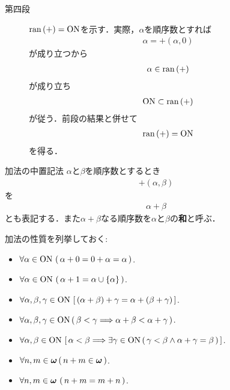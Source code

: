 \begin{sketch}
\begin{description}
			\item[第四段] $\operatorname*{ran} \left(+\right) = \mathrm{ON}$を示す．実際，$\alpha$を順序数とすれば
				\begin{align}
					\alpha = +(\alpha,0)
				\end{align}
				が成り立つから
				\begin{align}
					\alpha \in \operatorname*{ran} \left(+\right)
				\end{align}
				が成り立ち
				\begin{align}
					\mathrm{ON} \subset \operatorname*{ran} \left(+\right)
				\end{align}
				が従う．前段の結果と併せて
				\begin{align}
					\operatorname*{ran} \left(+\right) = \mathrm{ON}
				\end{align}
				を得る．
				\QED
		\end{description}
	\end{sketch}
	
	\begin{itembox}[l]{加法の中置記法}
		$\alpha$と$\beta$を順序数とするとき
		\begin{align}
			+(\alpha,\beta)
		\end{align}
		を
		\begin{align}
			\alpha + \beta
		\end{align}
		とも表記する．また$\alpha + \beta$なる順序数を$\alpha$と$\beta$の{\bf 和}と呼ぶ．
	\end{itembox}
	
	加法の性質を列挙しておく:
	\begin{itemize}
		\item $\forall \alpha \in \mathrm{ON}\, \left(\, \alpha + 0 = 0 + \alpha = \alpha\, \right)$.
		\item $\forall \alpha \in \mathrm{ON}\, \left(\, \alpha + 1 = \alpha \cup \{\alpha\}\, \right)$.
		\item $\forall \alpha,\beta,\gamma \in \mathrm{ON}\, \left[\, (\alpha + \beta) + \gamma = \alpha + (\beta + \gamma)\, \right]$.
		\item $\forall \alpha,\beta,\gamma \in \mathrm{ON}\, (\, \beta < \gamma \Longrightarrow \alpha + \beta < \alpha + \gamma\, )$.
		\item $\forall \alpha,\beta \in \mathrm{ON}\, \left[\, \alpha < \beta
				\Longrightarrow \exists \gamma \in \mathrm{ON}\, (\, \gamma < \beta \wedge \alpha + \gamma = \beta\, )\, \right]$.
		\item $\forall n, m \in {\boldsymbol \omega}\, (\, n + m \in {\boldsymbol \omega}\, )$.
		\item $\forall n,m \in {\boldsymbol \omega}\ (\, n + m = m + n\, )$.
	\end{itemize}
	
